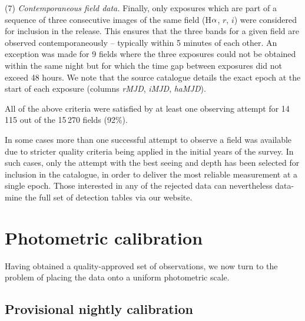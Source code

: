 \documentclass[useAMS,usenatbib]{mn2e}
\def\ha{\mbox{H$\rm \alpha$}}
\begin{document}
(7) \emph{Contemporaneous field data.} 
Finally, only exposures which are part of a sequence 
of three consecutive images of the same field
(\ha, $r$, $i$)
were considered for inclusion in the release. 
This ensures that the three bands for a given field
are observed contemporaneously --  
typically within 5 minutes of each other.
An exception was made for 9 fields where the three exposures 
could not be obtained within the same night
but for which the time gap between exposures did not exceed 48 hours.
We note that the source catalogue details the exact epoch
at the start of each exposure
(columns \emph{rMJD}, \emph{iMJD}, \emph{haMJD}).

All of the above criteria were satisfied by at least one observing attempt
for 14\,115 out of the 15\,270 fields (92\%).

In some cases more than one successful attempt to observe
a field was available due to stricter
quality criteria being applied in the initial years of the survey.
In such cases, only the attempt 
with the best seeing and depth has been selected
for inclusion in the catalogue, in order  
to deliver the most reliable measurement at a single epoch.
Those interested in any of the rejected data 
can nevertheless data-mine the full set of detection tables 
via our website.


\section{Photometric calibration}
\label{sec:calibration}

Having obtained a quality-approved set of observations,
we now turn to the problem of placing the data
onto a uniform photometric scale.

\subsection{Provisional nightly calibration}
\end{document}
